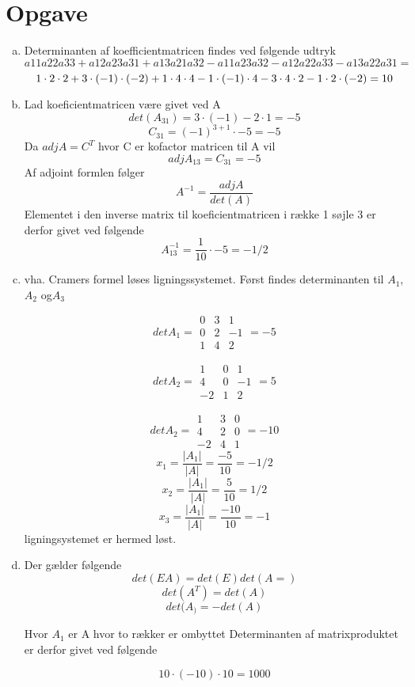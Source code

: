 \documentclass[12pt]{article}
\begin{document}
\section{Opgave}
\begin{enumerate}[(a)]
\item
Determinanten af koefficientmatricen findes ved følgende udtryk
$$
a{11}a{22}a{33+}a{12}a{23}a{31+ }a{13}a{21}a{32-
}a{11}a{23}a{32-}a{12}a{22}a{33- }a{13}a{22}a{31}=
$$
$$
 1 \cdot 2 \cdot 2+
 3 \cdot (-1) \cdot (-2)+
 1 \cdot 4 \cdot 4-
 1 \cdot (-1) \cdot 4-
 3 \cdot 4 \cdot 2-
 1 \cdot 2 \cdot (-2)=10
$$
\item
Lad koeficientmatricen være givet ved A
$$
det(A_{31}) = 3\cdot (-1)-2 \cdot 1= -5
$$
$$
C_{31} = (-1)^{3+1} \cdot -5= -5
$$
Da $adjA = C^T$ hvor C er kofactor matricen til A vil
$$adjA_{13}= C_{31}=-5$$
Af adjoint formlen følger
$$
A^{-1}=\frac{adjA}{det(A)}
$$
Elementet i den inverse matrix til koeficientmatricen i række 1 søjle 3 er
derfor givet ved følgende
$$
A^{-1}_{13} = \frac{1}{10}\cdot -5=-1/2
$$

\item 
vha. Cramers formel løses ligningssystemet. Først findes determinanten til
$A_1$, $A_2$ og$A_3$

$$
detA_1=\begin{array}{|ccc|}
0&3&1\\
0&2&-1\\
1&4&2
\end{array} = -5
$$

$$
detA_2=\begin{array}{|ccc|}
1&0&1\\
4&0&-1\\
-2&1&2
\end{array}=5
$$

$$
detA_2=\begin{array}{|ccc|}
1&3&0\\
4&2&0\\
-2&4&1
\end{array}=-10
$$
$$
x_1 = \frac{|A_1|}{|A|}=\frac{-5}{10}=-1/2
$$
$$
x_2 = \frac{|A_1|}{|A|}=\frac{5}{10}=1/2
$$
$$
x_3 = \frac{|A_1|}{|A|}=\frac{-10}{10}=-1
$$
ligningsystemet er hermed løst.
\item
Der gælder følgende
$$det(EA)=det(E)det(A=)$$
$$det(A^T)=det(A)$$
$$det(A_)=-det(A)$$

Hvor $A_1$ er A hvor to rækker er ombyttet
Determinanten af matrixproduktet er derfor givet ved følgende

$$10\cdot (-10)\cdot 10 = 1000$$ 

\end{enumerate}
\end{document}

